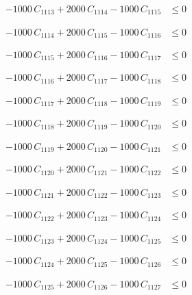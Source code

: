 \documentclass[a4paper,11pt]{article}
\begin{document}
\begin{align}
-1000\,C_{1113} + 2000\,C_{1114} - 1000\,C_{1115} &\leq 0 \nonumber
\end{align}

\begin{align}
-1000\,C_{1114} + 2000\,C_{1115} - 1000\,C_{1116} &\leq 0 \nonumber
\end{align}

\begin{align}
-1000\,C_{1115} + 2000\,C_{1116} - 1000\,C_{1117} &\leq 0 \nonumber
\end{align}

\begin{align}
-1000\,C_{1116} + 2000\,C_{1117} - 1000\,C_{1118} &\leq 0 \nonumber
\end{align}

\begin{align}
-1000\,C_{1117} + 2000\,C_{1118} - 1000\,C_{1119} &\leq 0 \nonumber
\end{align}

\begin{align}
-1000\,C_{1118} + 2000\,C_{1119} - 1000\,C_{1120} &\leq 0 \nonumber
\end{align}

\begin{align}
-1000\,C_{1119} + 2000\,C_{1120} - 1000\,C_{1121} &\leq 0 \nonumber
\end{align}

\begin{align}
-1000\,C_{1120} + 2000\,C_{1121} - 1000\,C_{1122} &\leq 0 \nonumber
\end{align}

\begin{align}
-1000\,C_{1121} + 2000\,C_{1122} - 1000\,C_{1123} &\leq 0 \nonumber
\end{align}

\begin{align}
-1000\,C_{1122} + 2000\,C_{1123} - 1000\,C_{1124} &\leq 0 \nonumber
\end{align}

\begin{align}
-1000\,C_{1123} + 2000\,C_{1124} - 1000\,C_{1125} &\leq 0 \nonumber
\end{align}

\begin{align}
-1000\,C_{1124} + 2000\,C_{1125} - 1000\,C_{1126} &\leq 0 \nonumber
\end{align}

\begin{align}
-1000\,C_{1125} + 2000\,C_{1126} - 1000\,C_{1127} &\leq 0 \nonumber
\end{align}
\end{document}
